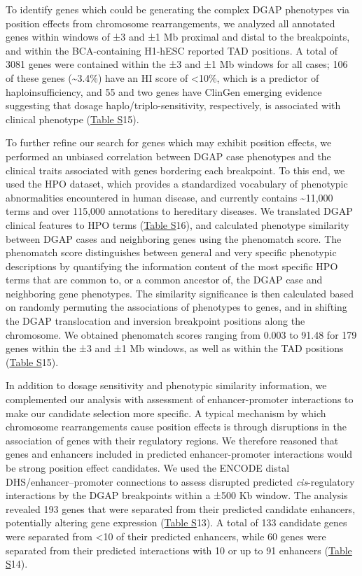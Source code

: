 \documentclass[a4paper,twoside=true,openright,parskip=full,chapterprefix=true,11pt,headings=normal,bibliography=totoc,listof=totoc,titlepage=on,captions=tableabove,draft=false]{scrreprt}
\theoremstyle{definition}
\theoremstyle{definition}
\theoremstyle{definition}
\theoremstyle{remark}
\begin{document}
To identify genes which could be generating the complex DGAP phenotypes
via position effects from chromosome rearrangements, we analyzed all
annotated genes within windows of ±3 and ±1 Mb proximal and distal to
the breakpoints, and within the BCA-containing H1-hESC reported TAD
positions. A total of 3081 genes were contained within the ±3 and ±1 Mb
windows for all cases; 106 of these genes (\textasciitilde{}3.4\%) have
an HI score of \textless{}10\%, which is a predictor of
haploinsufficiency,\citep{Huang2010} and 55 and two genes have ClinGen
emerging evidence suggesting that dosage haplo/triplo-sensitivity,
respectively, is associated with clinical phenotype
(\protect\hyperlink{position-effect-sub-tab}{Table S}15).

To further refine our search for genes which may exhibit position
effects, we performed an unbiased correlation between DGAP case
phenotypes and the clinical traits associated with genes bordering each
breakpoint. To this end, we used the HPO dataset,\citep{Kohler2014}
which provides a standardized vocabulary of phenotypic abnormalities
encountered in human disease, and currently contains
\textasciitilde{}11,000 terms and over 115,000 annotations to hereditary
diseases. We translated DGAP clinical features to HPO terms
(\protect\hyperlink{position-effect-sub-tab}{Table S}16), and calculated
phenotype similarity between DGAP cases and neighboring genes using the
phenomatch score.\citep{Ibn-Salem2014} The phenomatch score
distinguishes between general and very specific phenotypic descriptions
by quantifying the information content of the most speciﬁc HPO terms
that are common to, or a common ancestor of, the DGAP case and
neighboring gene phenotypes. The similarity significance is then
calculated based on randomly permuting the associations of phenotypes to
genes, and in shifting the DGAP translocation and inversion breakpoint
positions along the chromosome. We obtained phenomatch scores ranging
from 0.003 to 91.48 for 179 genes within the ±3 and ±1 Mb windows, as
well as within the TAD positions
(\protect\hyperlink{position-effect-sub-tab}{Table S}15).

In addition to dosage sensitivity and phenotypic similarity information,
we complemented our analysis with assessment of enhancer-promoter
interactions to make our candidate selection more specific. A typical
mechanism by which chromosome rearrangements cause position effects is
through disruptions in the association of genes with their regulatory
regions.\citep{Kleinjan2005, Kleinjan1998} We therefore reasoned that
genes and enhancers included in predicted enhancer-promoter interactions
would be strong position effect candidates. We used the ENCODE distal
DHS/enhancer--promoter connections\citep{Thurman2012} to assess
disrupted predicted \emph{cis}-regulatory interactions by the DGAP
breakpoints within a ±500 Kb window. The analysis revealed 193 genes
that were separated from their predicted candidate enhancers,
potentially altering gene expression
(\protect\hyperlink{position-effect-sub-tab}{Table S}13). A total of 133
candidate genes were separated from \textless{}10 of their predicted
enhancers, while 60 genes were separated from their predicted
interactions with 10 or up to 91 enhancers
(\protect\hyperlink{position-effect-sub-tab}{Table S}14).
\end{document}
